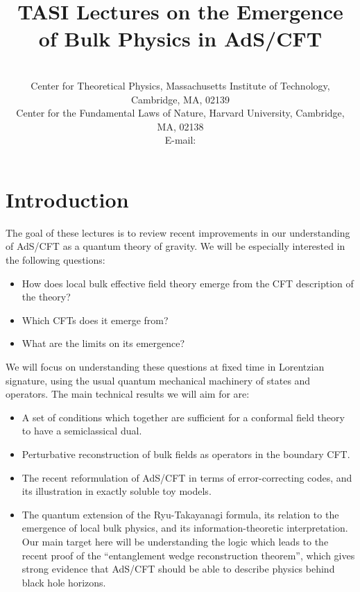\documentclass[toc]{PoS}
\title{TASI Lectures on the Emergence of Bulk Physics in AdS/CFT}
\author{\speaker{Daniel Harlow}\\%
       Center for Theoretical Physics, Massachusetts Institute of Technology, Cambridge, MA, 02139\\
			 Center for the Fundamental Laws of Nature, Harvard University, Cambridge, MA, 02138\\			
       E-mail: \email{harlow@mit.edu}}
\newcommand{\bi}{\begin{itemize}}
\newcommand{\ei}{\end{itemize}}
\begin{document}

\tableofcontents
\section{Introduction}
The goal of these lectures is to review recent improvements in our understanding of AdS/CFT as a quantum theory of gravity.  We will be especially interested in the following questions:
\bi
\item How does local bulk effective field theory emerge from the CFT description of the theory?
\item Which CFTs does it emerge from?
\item What are the limits on its emergence?
\ei
We will focus on understanding these questions at fixed time in Lorentzian signature, using the usual quantum mechanical machinery of states and operators. The main technical results we will aim for are:
\bi
\item A set of conditions which together are sufficient for a conformal field theory to have a semiclassical dual.
\item Perturbative reconstruction of bulk fields as operators in the boundary CFT.
\item The recent reformulation of AdS/CFT in terms of error-correcting codes, and its illustration in exactly soluble toy models.  
\item The quantum extension of the Ryu-Takayanagi formula, its relation to the emergence of local bulk physics, and its information-theoretic interpretation.  Our main target here will be understanding the logic which leads to the recent proof of the ``entanglement wedge reconstruction theorem'', which gives strong evidence that AdS/CFT should be able to describe physics behind black hole horizons.
\ei
\end{document}
